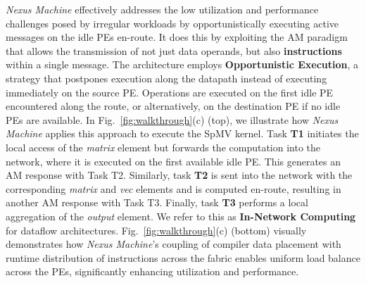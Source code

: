 \textit{Nexus Machine} effectively addresses the low utilization and performance challenges posed by irregular workloads by opportunistically executing active messages on the idle PEs en-route.
It does this by exploiting the AM paradigm that allows the transmission of not just data operands, but also {\bf instructions} within a single message.
The architecture employs \textbf{Opportunistic Execution}, a strategy that postpones execution along the datapath instead of executing immediately on the source PE. Operations are executed on the first idle PE encountered along the route, or alternatively, on the destination PE if no idle PEs are available.
In Fig.~\ref{fig:walkthrough}(c) (top), we illustrate how \textit{Nexus Machine} applies this approach to execute the SpMV kernel.
Task \textbf{T1} initiates the local access of the \textit{matrix} element but forwards the computation into the network, where it is executed on the first available idle PE. 
This generates an AM response with Task T2.
Similarly, task \textbf{T2} is sent into the network with the corresponding \textit{matrix} and \textit{vec} elements and is computed en-route, resulting in another AM response with Task T3.
Finally, task \textbf{T3} performs a local aggregation of the \textit{output} element. 
We refer to this as \textbf{In-Network Computing} for dataflow architectures.
Fig.~\ref{fig:walkthrough}(c) (bottom) visually demonstrates how \textit{Nexus Machine}'s coupling of compiler data placement with runtime distribution of instructions across the fabric enables uniform load balance across the PEs, significantly enhancing utilization and performance.
